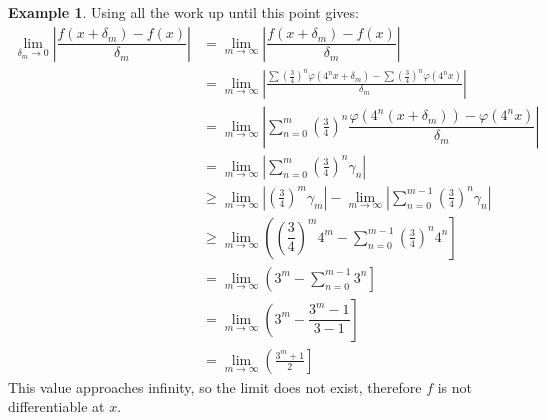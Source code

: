 \documentclass{article}
\theoremstyle{definition}
\newtheorem{example}{Example}[section]
\begin{document}
\begin{example}
		Using all the work up until this point gives:
		\begin{align*}
			\lim\limits_{\delta_m\to 0}\left\lvert \dfrac{f(x + \delta_m)- f(x)}{\delta_m}\right\rvert & = \lim\limits_{m\to \infty}\left\lvert \dfrac{f(x + \delta_m)- f(x)}{\delta_m}\right\rvert \\
			& = \lim\limits_{m\to \infty}\left\lvert \frac{\sum\left(\frac{3}{4}\right)^n\varphi(4^nx + \delta_m) - \sum\left(\frac{3}{4}\right)^n\varphi(4^nx)}{\delta_m}\right\rvert \\& = \lim\limits_{m\to \infty}\left\lvert  \sum_{n=0}^{m}\left(\frac{3}{4}\right)^n\dfrac{\varphi(4^n(x+\delta_m)) - \varphi(4^nx)}{\delta_m}\right\rvert \\ & = \lim\limits_{m\to \infty}\left\lvert  \sum_{n=0}^{m}\left(\frac{3}{4}\right)^n\gamma_n\right\rvert\\ & \ge\lim\limits_{m\to \infty}\left\lvert \left(\frac{3}{4}\right)^m\gamma_m\right\rvert -  \lim\limits_{m\to \infty}\left\lvert \sum_{n=0}^{m-1}\left(\frac{3}{4}\right)^n\gamma_n\right\rvert\\ & \ge \lim\limits_{m\to \infty} \left(\left(\dfrac{3}{4}\right)^m4^m - \sum_{n=0}^{m-1}\left(\frac{3}{4}\right)^n4^n\right]\\ & = \lim\limits_{m\to\infty}\left(3^m - \sum_{n=0}^{m-1}3^n\right] \\& = \lim\limits_{m\to\infty}\left(3^m - \dfrac{3^m-1}{3-1}\right] \\ & = \lim\limits_{m\to\infty}\left(\frac{3^m+1}{2}\right] 
		\end{align*}
		This value approaches infinity, so the limit does not exist, therefore $ f $ is not differentiable at $ x $. 
	\end{example}
	
\end{document}
